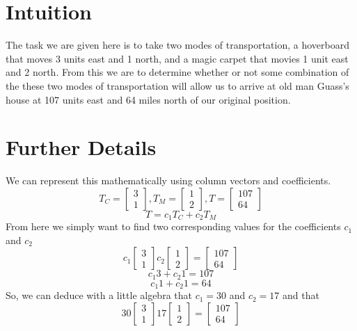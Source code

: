 \documentclass{article}
\begin{document}
\section{Intuition}
The task we are given here is to take two modes of transportation, a hoverboard that moves
3 units east and 1 north, and a magic carpet that movies 1 unit east and 2 north.
From this we are to determine whether or not some combination of the these two
modes of transportation will allow us to arrive at old man Guass's house at
107 units east and 64 miles north of our original position.
\section{Further Details}
We can represent this mathematically using column vectors and coefficients.
\[
T_C = \begin{bmatrix}
3 \\ 1 
\end{bmatrix}
,
T_M = \begin{bmatrix}
1 \\ 2
\end{bmatrix}
,
T = \begin{bmatrix}
107 \\ 64
\end{bmatrix}
\]
\[
T = {c_1}{T_C}+{c_2}{T_M}
\]
From here we simply want to find two corresponding values for the 
coefficients ${c_1}$ and ${c_2}$
\[
{c_1}
\begin{bmatrix}
3 \\ 1 
\end{bmatrix}
{c_2}
\begin{bmatrix}
1 \\ 2
\end{bmatrix}
=
\begin{bmatrix}
107 \\ 64
\end{bmatrix}
\]
\[{c_1}3+{c_2}1=107\]
\[{c_1}1+{c_2}1=64\]
So, we can deduce with a little algebra that ${c_1}=30$ and ${c_2}=17$ and that
\[
30
\begin{bmatrix}
3 \\ 1 
\end{bmatrix}
17
\begin{bmatrix}
1 \\ 2
\end{bmatrix}
=
\begin{bmatrix}
107 \\ 64
\end{bmatrix}
\]
\end{document}
